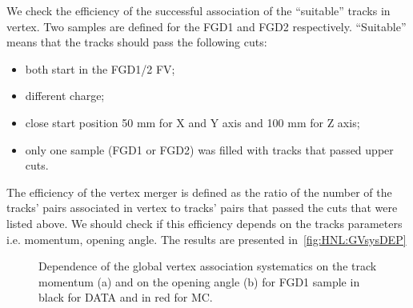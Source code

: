 \documentclass[../main.tex]{subfiles}
\begin{document}
We check the efficiency of the successful association of the ``suitable'' tracks in vertex. Two samples are defined for the FGD1 and FGD2 respectively. ``Suitable'' means that the tracks should pass the following cuts:
\begin{itemize}
    \item both start in the FGD1/2 FV;
    \item different charge;
    \item close start position 50 mm for X and Y axis and 100 mm for Z axis;
    \item only one sample (FGD1 or FGD2) was filled with tracks that passed upper cuts.
\end{itemize}
The efficiency of the vertex merger is defined as the ratio of the number of the tracks' pairs associated in vertex to tracks' pairs that passed the cuts that were listed above. We should check if this efficiency depends on the tracks parameters i.e. momentum, opening angle. The results are presented in~\autoref{fig:HNL:GVsysDEP}
\begin{figure}[!ht]
    \begin{minipage}[h]{0.49\linewidth}
    \end{minipage}
    \hfill
    \begin{minipage}[h]{0.49\linewidth}
    \end{minipage}
    \vfill
    \begin{minipage}[h]{0.49\linewidth}
    \end{minipage}
    \hfill
    \begin{minipage}[h]{0.49\linewidth}
    \end{minipage}
    \caption{Dependence of the global vertex association systematics on the  track momentum (a) and on the opening angle (b) for FGD1 sample in black for DATA and in red for MC.}
    \label{fig:HNL:GVsysDEP}
\end{figure}
\end{document}
